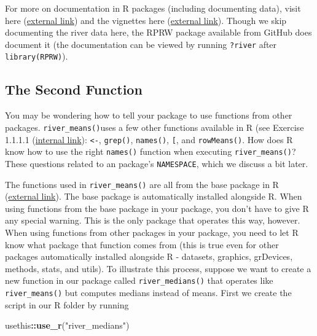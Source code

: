 \documentclass[
]{book}
\newenvironment{Shaded}{\begin{snugshade}}{\end{snugshade}}
\newcommand{\KeywordTok}[1]{\textcolor[rgb]{0.13,0.29,0.53}{\textbf{#1}}}
\newcommand{\NormalTok}[1]{#1}
\newcommand{\OperatorTok}[1]{\textcolor[rgb]{0.81,0.36,0.00}{\textbf{#1}}}
\newcommand{\StringTok}[1]{\textcolor[rgb]{0.31,0.60,0.02}{#1}}
\begin{document}
For more on documentation in R packages (including documenting data), visit here (\href{https://r-pkgs.org/man.html\#man}{external link}) and the vignettes here (\href{https://cran.r-project.org/web/packages/roxygen2/index.html}{external link}). Though we skip documenting the river data here, the RPRW package available from GitHub does document it (the documentation can be viewed by running \texttt{?river} after \texttt{library(RPRW)}).

\hypertarget{second-function}{%
\subsection{The Second Function}\label{second-function}}

You may be wondering how to tell your package to use functions from other packages. \texttt{river\_means()}uses a few other functions available in R (see Exercise 1.1.1.1 (\protect\hyperlink{ex-set1}{internal link}): \texttt{\textless{}-}, \texttt{grep()}, \texttt{names()}, \texttt{{[}}, and \texttt{rowMeans()}. How does R know how to use the right \texttt{names()} function when executing \texttt{river\_means()}? These questions related to an package's \texttt{NAMESPACE}, which we discuss a bit later.

The functions used in \texttt{river\_means()} are all from the base package in R (\href{https://stat.ethz.ch/R-manual/R-devel/library/base/html/00Index.html}{external link}). The base package is automatically installed alongside R. When using functions from the base package in your package, you don't have to give R any special warning. This is the only package that operates this way, however. When using functions from other packages in your package, you need to let R know what package that function comes from (this is true even for other packages automatically installed alongside R - datasets, graphics, grDevices, methods, stats, and utils). To illustrate this process, suppose we want to create a new function in our package called \texttt{river\_medians()} that operates like \texttt{river\_means()} but computes medians instead of means. First we create the script in our R folder by running

\begin{Shaded}
\begin{Highlighting}[]
\NormalTok{usethis}\OperatorTok{::}\KeywordTok{use_r}\NormalTok{(}\StringTok{"river_medians"}\NormalTok{)}
\end{Highlighting}
\end{Shaded}
\end{document}
